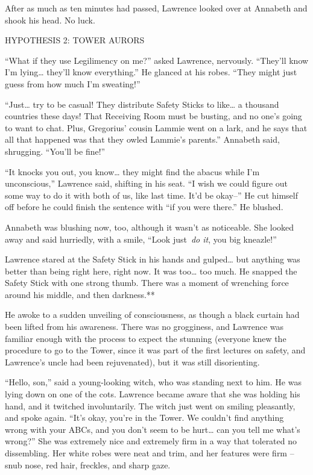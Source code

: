 After as much as ten minutes had passed, Lawrence looked over at
Annabeth and shook his head. No luck.

\mybreak

HYPOTHESIS 2: TOWER AURORS

``What if they use Legilimency on me?'' asked Lawrence, nervously.
``They'll know I'm lying\ldots{} they'll know everything.'' He glanced
at his robes. ``They might just guess from how much I'm sweating!''

``Just\ldots{} try to be casual! They distribute Safety Sticks to
like\ldots{} a thousand countries these days! That Receiving Room must
be busting, and no one's going to want to chat. Plus, Gregorius' cousin
Lammie went on a lark, and he says that all that happened was that they
owled Lammie's parents.'' Annabeth said, shrugging. ``You'll be fine!''

``It knocks you out, you know\ldots{} they might find the abacus while
I'm unconscious,'' Lawrence said, shifting in his seat. ``I wish we
could figure out some way to do it with both of us, like last time. It'd
be okay--'' He cut himself off before he could finish the sentence with
``if you were there.'' He blushed.

Annabeth was blushing now, too, although it wasn't as noticeable. She
looked away and said hurriedly, with a smile, ``Look just~\emph{do it},
you big kneazle!''

Lawrence stared at the Safety Stick in his hands and gulped\ldots{} but
anything was better than being right here, right now. It was too\ldots{}
too much. He snapped the Safety Stick with one strong thumb. There was a
moment of wrenching force around his middle, and then darkness.**

He awoke to a sudden unveiling of consciousness, as though a black
curtain had been lifted from his awareness. There was no grogginess, and
Lawrence was familiar enough with the process to expect the stunning
(everyone knew the procedure to go to the Tower, since it was part of
the first lectures on safety, and Lawrence's uncle had been
rejuvenated), but it was still disorienting.

``Hello, son,'' said a young-looking witch, who was standing next to
him. He was lying down on one of the cots. Lawrence became aware that
she was holding his hand, and it twitched involuntarily. The witch just
went on smiling pleasantly, and spoke again. ``It's okay, you're in the
Tower. We couldn't find anything wrong with your ABCs, and you don't
seem to be hurt\ldots{} can you tell me what's wrong?'' She was
extremely nice and extremely firm in a way that tolerated no
dissembling. Her white robes were neat and trim, and her features were
firm -- snub nose, red hair, freckles, and sharp gaze.

